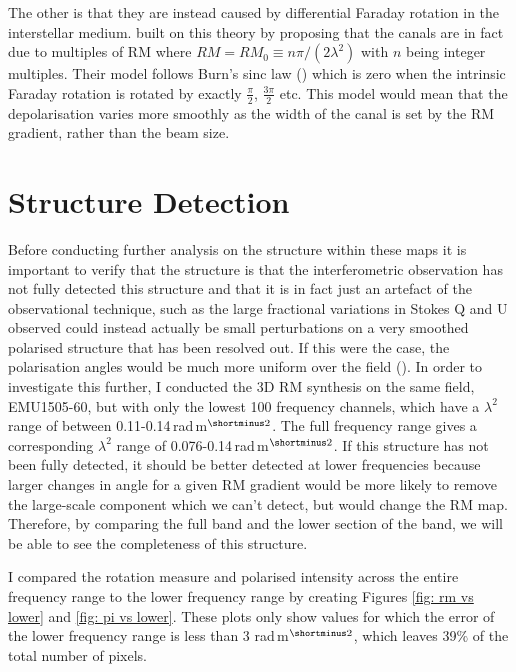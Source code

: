 The other is that they are instead caused by differential Faraday rotation in the interstellar medium. %
\cite{Shukurov_and_Berkhuijsen_2003} built on this theory by proposing that the canals are in fact due to multiples of RM where $RM = RM_0 \equiv n\pi / (2\lambda^2)$ with $n$ being integer multiples. Their model follows Burn's sinc law (\cite{burn_1966}) which is zero when the intrinsic Faraday rotation is rotated by exactly $\frac{\pi}{2}$, $\frac{3\pi}{2}$ etc. This model would mean that the depolarisation varies more smoothly as the width of the canal is set by the RM gradient, rather than the beam size.

\section{Structure Detection}

Before conducting further analysis on the structure within these maps it is important to verify that the structure is that the interferometric observation has not fully detected this structure and that it is in fact just an artefact of the observational technique, such as the large fractional variations in Stokes Q and U observed could instead actually be small perturbations on a very smoothed polarised structure that has been resolved out. If this were the case, the polarisation angles would be much more uniform over the field (\cite{Haverkorn_2004}). In order to investigate this further, I conducted the 3D RM synthesis on the same field, EMU1505-60, but with only the lowest 100 frequency channels, which have a $\lambda^2$ range of between 0.11-0.14$\,$rad$\,$m$^{\shortminus2}$. The full frequency range gives a corresponding $\lambda^2$ range of 0.076-0.14$\,$rad$\,$m$^{\shortminus2}$. If this structure has not been fully detected, it should be better detected at lower frequencies because larger changes in angle for a given RM gradient would be more likely to remove the large-scale component which we can't detect, but would change the RM map. Therefore, by comparing the full band and the lower section of the band, we will be able to see the completeness of this structure. 

I compared the rotation measure and polarised intensity across the entire frequency range to the lower frequency range by creating Figures \ref{fig: rm vs lower} and \ref{fig: pi vs lower}. These plots only show values for which the error of the lower frequency range is less than 3 rad$\,$m$^{\shortminus2}$, which leaves 39$\%$ of the total number of pixels.

